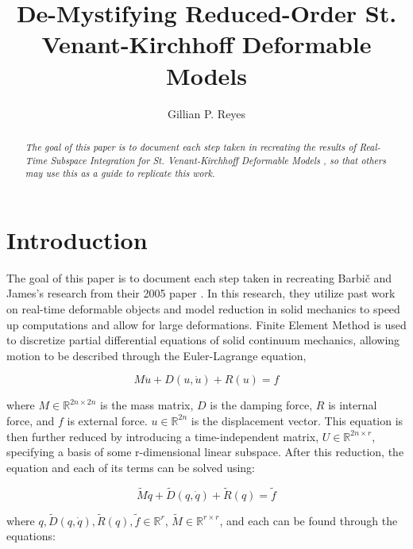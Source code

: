 \documentclass[twocolumn,10pt]{asme2ej}
\title{De-Mystifying Reduced-Order St. Venant-Kirchhoff Deformable Models}
\author{Gillian P. Reyes
}
\begin{document}
\maketitle

\begin{abstract}
{\it The goal of this paper is to document each step taken in recreating
the results of Real-Time Subspace Integration for St. Venant-Kirchhoff Deformable Models \cite{barbic}, so that
others may use this as a guide to replicate this work.
}
\end{abstract}

\section{Introduction}

The goal of this paper is to document each step taken in recreating Barbič and James's research from their 2005
paper \cite{barbic}. In this research, they utilize past work on real-time deformable objects and model reduction in solid mechanics to speed up computations and allow for large deformations. Finite Element Method is used to discretize partial differential equations of solid continuum mechanics, allowing motion to be described through the Euler-Lagrange equation,

\begin{equation}
M\ddot u + D(u, \dot u) + R(u) = f
\label{eq_motion}
\end{equation}

where $M \in \mathbb{R}^{2n \times 2n }$ is the mass matrix, $D$ is the damping force, $R$ is internal force, and $f$ is external force. $u \in \mathbb{R}^{2n}$ is the displacement vector. This equation is then further reduced by introducing a time-independent matrix, $U \in \mathbb{R}^{2n \times r}$, specifying a basis of some r-dimensional linear subspace. After this reduction, the equation and each of its terms can be solved using:

\begin{equation}
\tilde{M}\ddot q + \tilde{D}(q, \dot q) + \tilde{R}(q) = \tilde{f}
\label{eq_rmotion}
\end{equation}

where $q, \tilde{D}(q, \dot q), \tilde{R}(q), \tilde{f} \in \mathbb{R}^{r}$, $\tilde{M} \in \mathbb{R}^{r \times r}$, and each
can be found through the equations:
\end{document}

